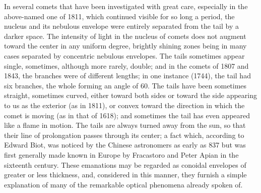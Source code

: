 In several comets that have been investigated with great care, especially in the above-named one of 1811, which continued visible for so long a period, the nucleus and its nebulous envelope were entirely separated from the tail by a darker space. The intensity of light in the nucleus of comets does not augment toward the center in any uniform degree, brightly shining zones being in many cases separated by concentric nebulous envelopes. The tails sometimes appear single, sometimes, although more rarely, double; and in the comets of 1807 and 1843, the branches were of different lengths; in one instance (1744), the tail had six branches, the whole forming an angle of 60. The tails have been sometimes straight, sometimes curved, either toward both sides or toward the side appearing to us as the exterior (as in 1811), or convex toward the direction in which the comet is moving (as in that of 1618); and sometimes the tail has even appeared like a flame in motion. The tails are always turned away from the sun, so that their line of prolongation passes through its center; a fact which, according to Edward Biot, was noticed by the Chinese astronomers as early as 837 but was first generally made known in Europe by Fracastoro and Peter Apian in the sixteenth century. These emanations may be regarded as conoidal envelopes of greater or less thickness, and, considered in this manner, they furnish a simple explanation of many of the remarkable optical phenomena already spoken of.

